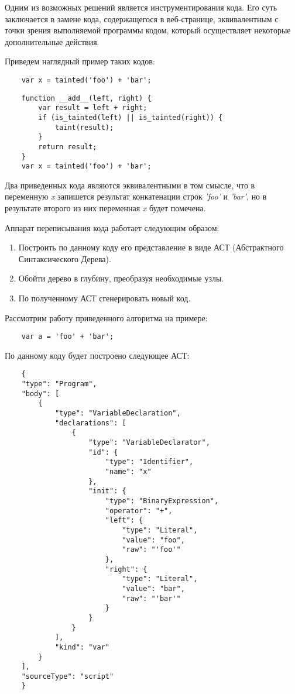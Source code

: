 Одним из возможных решений является инструментирования кода. Его суть заключается в замене кода, содержащегося в веб-странице, эквивалентным с точки зрения выполняемой программы кодом, который осуществляет некоторые дополнительные действия.


Приведем наглядный пример таких кодов:

\bigskip
\begin{lstlisting}
	var x = tainted('foo') + 'bar';
\end{lstlisting}


\begin{lstlisting}
	function __add__(left, right) {
		var result = left + right;
		if (is_tainted(left) || is_tainted(right)) {
			taint(result);
		}
		return result;
	}
	var x = tainted('foo') + 'bar';
\end{lstlisting}


Два приведенных кода являются эквивалентными в том смысле, что в переменную \textit{x} запишется результат конкатенации строк \textit{'foo'} и \textit{'bar'}, но в результате второго из них переменная \textit{x} будет помечена.


Аппарат переписывания кода работает следующим образом:


\begin{enumerate}
	\item Построить по данному коду его представление в виде АСТ (Абстрактного Синтаксического Дерева).
	\item Обойти дерево в глубину, преобразуя необходимые узлы.
	\item По полученному АСТ сгенерировать новый код.
\end{enumerate}


Рассмотрим работу приведенного алгоритма на примере:

\bigskip
\begin{lstlisting}
	var a = 'foo' + 'bar';
\end{lstlisting}


По данному коду будет построено следующее АСТ:

\bigskip
\begin{lstlisting}
	{
    "type": "Program",
    "body": [
        {
            "type": "VariableDeclaration",
            "declarations": [
                {
                    "type": "VariableDeclarator",
                    "id": {
                        "type": "Identifier",
                        "name": "x"
                    },
                    "init": {
                        "type": "BinaryExpression",
                        "operator": "+",
                        "left": {
                            "type": "Literal",
                            "value": "foo",
                            "raw": "'foo'"
                        },
                        "right": {
                            "type": "Literal",
                            "value": "bar",
                            "raw": "'bar'"
                        }
                    }
                }
            ],
            "kind": "var"
        }
    ],
    "sourceType": "script"
	}
\end{lstlisting}


